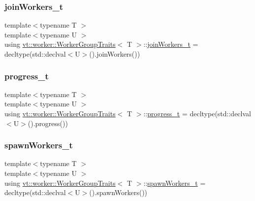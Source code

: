 \subsubsection{\texorpdfstring{join\+Workers\+\_\+t}{joinWorkers\_t}}
{\footnotesize\ttfamily template$<$typename T $>$ \\
template$<$typename U $>$ \\
using \hyperlink{structvt_1_1worker_1_1_worker_group_traits}{vt\+::worker\+::\+Worker\+Group\+Traits}$<$ T $>$\+::\hyperlink{structvt_1_1worker_1_1_worker_group_traits_a002c86e937f3022ee8320ec1d9eb488b}{join\+Workers\+\_\+t} =  decltype(std\+::declval$<$U$>$().join\+Workers())}

\mbox{\label{structvt_1_1worker_1_1_worker_group_traits_ae36a285568af422079494454bd4bdeae}} 
\subsubsection{\texorpdfstring{progress\+\_\+t}{progress\_t}}
{\footnotesize\ttfamily template$<$typename T $>$ \\
template$<$typename U $>$ \\
using \hyperlink{structvt_1_1worker_1_1_worker_group_traits}{vt\+::worker\+::\+Worker\+Group\+Traits}$<$ T $>$\+::\hyperlink{structvt_1_1worker_1_1_worker_group_traits_ae36a285568af422079494454bd4bdeae}{progress\+\_\+t} =  decltype(std\+::declval$<$U$>$().progress())}

\mbox{\label{structvt_1_1worker_1_1_worker_group_traits_a9a4aa1adc4280b6689a7c0212eca4577}} 
\subsubsection{\texorpdfstring{spawn\+Workers\+\_\+t}{spawnWorkers\_t}}
{\footnotesize\ttfamily template$<$typename T $>$ \\
template$<$typename U $>$ \\
using \hyperlink{structvt_1_1worker_1_1_worker_group_traits}{vt\+::worker\+::\+Worker\+Group\+Traits}$<$ T $>$\+::\hyperlink{structvt_1_1worker_1_1_worker_group_traits_a9a4aa1adc4280b6689a7c0212eca4577}{spawn\+Workers\+\_\+t} =  decltype(std\+::declval$<$U$>$().spawn\+Workers())}

